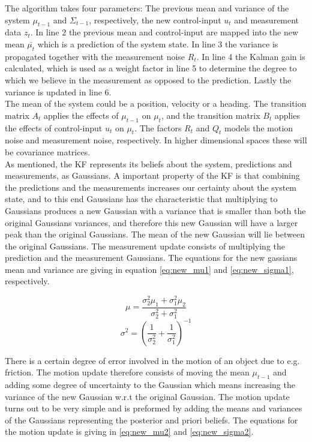 The algorithm takes four parameters: The previous mean and variance of the system $\mu_{t-1}$ and $\Sigma_{t-1}$, respectively, the new control-input $u_{t}$ and measurement data $z_{t}$. In line 2 the previous mean and control-input are mapped into the new mean $\bar{\mu_{t}}$ which is a prediction of the system state. In line 3 the variance is propagated together with the measurement noise $R_{t}$. In line 4 the Kalman gain is calculated, which is used as a weight factor in line 5 to determine the degree to which we believe in the measurement as opposed to the prediction. Lastly the variance is updated in line 6.\\

The mean of the system could be a position, velocity or a heading. The transition matrix $A_{t}$ applies the effects of $\mu_{t-1}$ on $\mu_{t}$, and the transition matrix $B_{t}$ applies the effects of control-input $u_{t}$ on $\mu_{t}$. The factors $R_{t}$ and $Q_{t}$ models the motion noise and measurement noise, respectively. In higher dimensional spaces these will be covariance matrices.\\

As mentioned, the KF represents its beliefs about the system, predictions and measurements, as Gaussians. A important property of the KF is that combining the predictions and the measurements increases our certainty about the system state, and to this end Gaussians has the characteristic that multiplying to Gaussians produces a new Gaussian with a variance that is smaller than both the original Gaussians variances, and therefore this new Gaussian will have a larger peak than the original Gaussians. The mean of the new Gaussian will lie between the original Gaussians.
The measurement update consists of multiplying the prediction and the measurement Gaussians. The equations for the new gassians mean and variance are giving in equation \ref{eq:new_mu1} and \ref{eq:new_sigma1}, respectively.

\begin{equation}
\label{eq:new_mu1}
\mu = \dfrac{\sigma_{2}^2\mu_{1} + \sigma_{1}^2\mu_{2}}{\sigma_{2}^2 + \sigma_{1}^2}
\end{equation}
\begin{equation}
\label{eq:new_sigma1}
\sigma^2 = (\dfrac{1}{\sigma_{2}^2} + \dfrac{1}{\sigma_{1}^2})^{-1}
\end{equation}

There is a certain degree of error involved in the motion of an object due to e.g. friction. The motion update therefore consists of moving the mean $\mu_{t-1}$ and adding some degree of uncertainty to the Gaussian which means increasing the variance of the new Gaussian w.r.t the original Gaussian. The motion update turns out to be very simple and is preformed by adding the means and variances of the Gaussians representing the posterior and priori beliefs. The equations for the motion update is giving in \ref{eq:new_mu2} and \ref{eq:new_sigma2}.

